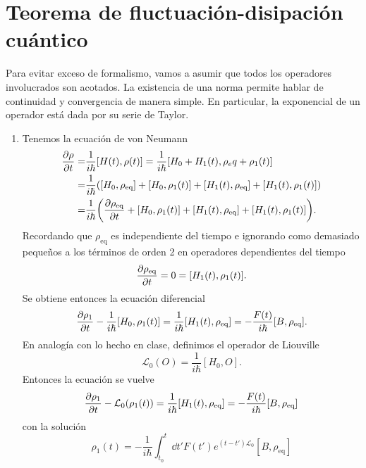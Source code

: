 \documentclass{article}
\begin{document}
\section{Teorema de fluctuación-disipación cuántico}

Para evitar exceso de formalismo, vamos a asumir que todos los operadores involucrados son acotados. La existencia de una norma permite hablar de continuidad y convergencia de manera simple. En particular, la exponencial de un operador está dada por su serie de Taylor.

\begin{enumerate}

\item Tenemos la ecuación de von Neumann
\begin{align}
\begin{split}
\pdv{\rho}{t} (t)=&\frac{1}{i\hbar}[H(t),\rho(t)]=\frac{1}{i\hbar}[H_0+H_1(t),\rho_eq+\rho_1(t)]\\
=&\frac{1}{i\hbar}\qty([H_0,\rho_{\text{eq}}]+[H_0,\rho_1(t)]+[H_1(t),\rho_{\text{eq}}]+[H_1(t),\rho_1(t)])\\
=&\frac{1}{i\hbar}\qty(\pdv{\rho_{\text{eq}}}{t} (t)+[H_0,\rho_1(t)]+[H_1(t),\rho_{\text{eq}}]+[H_1(t),\rho_1(t)]).
\end{split}
\end{align}
Recordando que $\rho_{\text{eq}}$ es independiente del tiempo e ignorando como demasiado pequeños a los términos de orden 2 en operadores dependientes del tiempo
\begin{equation}
\pdv{\rho_{\text{eq}}}{t} (t)=0=[H_1(t),\rho_1(t)].
\end{equation} 
Se obtiene entonces la ecuación diferencial
\begin{equation}
\pdv{\rho_1}{t} (t)-\frac{1}{i\hbar}[H_0,\rho_1(t)]=\frac{1}{i\hbar}[H_1(t),\rho_{\text{eq}}]=-\frac{F(t)}{i\hbar}[B,\rho_{\text{eq}}].
\end{equation}
En analogía con lo hecho en clase, definimos el operador de Liouville
\begin{equation}
\mathcal{L}_0(O)=\frac{1}{i\hbar}[H_0,O].
\end{equation}
Entonces la ecuación se vuelve
\begin{equation}
\pdv{\rho_1}{t} (t)-\mathcal{L}_0(\rho_1(t))=\frac{1}{i\hbar}[H_1(t),\rho_{\text{eq}}]=-\frac{F(t)}{i\hbar}[B,\rho_{\text{eq}}]
\end{equation}
con la solución
\begin{equation}
\rho_1(t)=-\frac{1}{i\hbar}\int_{t_0}^t\dd{t'}F(t')e^{(t-t')\mathcal{L}_0}[B,\rho_{\text{eq}}]

\end{equation}
\end{enumerate}
\end{document}
